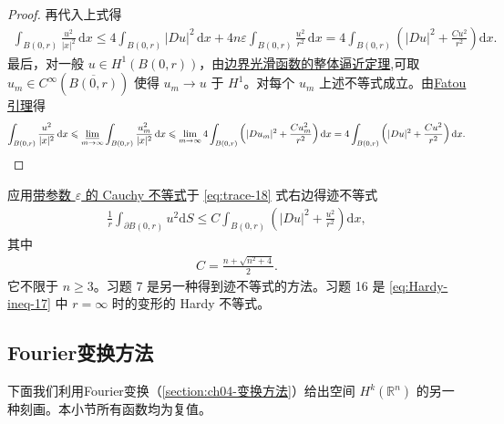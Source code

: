 \documentclass[../../main.tex]{subfiles}
\begin{document}
\begin{proof}
再代入上式得
\begin{align*}
\int_{B(0,r)} \frac{u^2}{|x|^2} \,\mathrm{d}x
\leqslant 4 \int_{B(0,r)} |Du|^2 \,\mathrm{d}x
+ 4n\varepsilon \int_{B(0,r)} \frac{u^2}{r^2} \,\mathrm{d}x= 4 \int_{B(0,r)} \left( |Du|^2 + \frac{C u^2}{r^2} \right) \mathrm{d}x.
\end{align*}
最后，对一般 $u\in H^1(B(0,r))$，由\hyperref[theorem:ch05-直到边界光滑的函数整体逼近定理]{边界光滑函数的整体逼近定理},可取 $u_m\in C^\infty(\overline{B(0,r)})$ 使得 $u_m\to u$ 于 $H^1$。对每个 $u_m$ 上述不等式成立。由\hyperref[Real Analysis-theorem:Fatou引理]{Fatou引理}得
\begin{align*}
\int_{B(0,r)} \frac{u^2}{|x|^2} \,\mathrm{d}x
\leqslant \varliminf_{m\to\infty} \int_{B(0,r)} \frac{u_m^2}{|x|^2} \,\mathrm{d}x \leqslant \lim_{m\to\infty} 4 \int_{B(0,r)} \left( |Du_m|^2 + \frac{C u_m^2}{r^2} \right) \mathrm{d}x
= 4 \int_{B(0,r)} \left( |Du|^2 + \frac{C u^2}{r^2} \right) \mathrm{d}x.
\end{align*}
\end{proof}
\begin{remark}
应用\hyperref[theorem:带参的Cauchy不等式]{带参数 $\varepsilon$ 的 Cauchy 不等式}于 \eqref{eq:trace-18} 式右边得迹不等式
\begin{align*}
\frac{1}{r} \int_{\partial B(0,r)} u^2 \mathrm{d}S
\leqslant C \int_{B(0,r)} \left( |Du|^2 + \frac{u^2}{r^2} \right) \mathrm{d}x,
\end{align*}
其中
\begin{align*}
C = \frac{n + \sqrt{n^2+4}}{2}.
\end{align*}
它不限于 $n\geqslant 3$。习题 7 是另一种得到迹不等式的方法。习题 16 是 \eqref{eq:Hardy-ineq-17} 中 $r=\infty$ 时的变形的 Hardy 不等式。
\end{remark}


\subsection{Fourier变换方法}\label{subsection:ch05-Fourier}

下面我们利用Fourier变换（\cref{section:ch04-变换方法}）给出空间 $H^{k}(\mathbb{R}^{n})$ 的另一种刻画。本小节所有函数均为复值。
\end{document}
